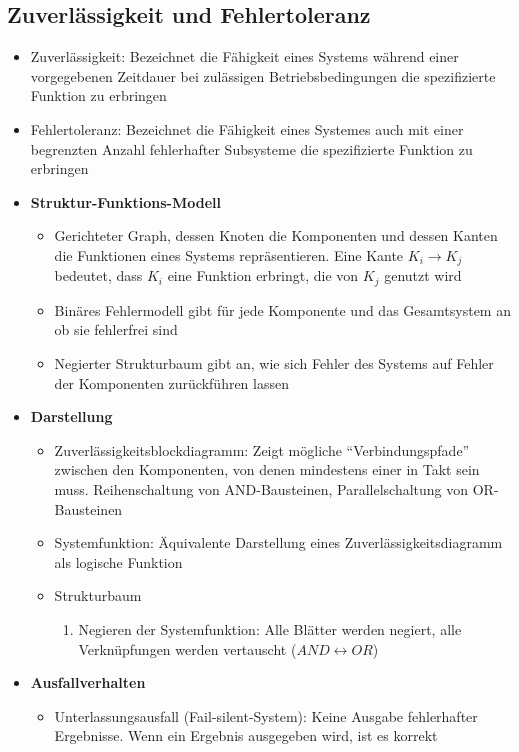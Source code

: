 \subsection{Zuverlässigkeit und Fehlertoleranz}
\begin{itemize}
	\item Zuverlässigkeit: Bezeichnet die Fähigkeit eines Systems während einer vorgegebenen Zeitdauer bei zulässigen Betriebsbedingungen die spezifizierte Funktion zu erbringen
	\item Fehlertoleranz: Bezeichnet die Fähigkeit eines Systemes auch mit einer begrenzten Anzahl fehlerhafter Subsysteme die spezifizierte Funktion zu erbringen
	\item \textbf{Struktur-Funktions-Modell}
	\begin{itemize}
		\item Gerichteter Graph, dessen Knoten die Komponenten und dessen Kanten die Funktionen eines Systems repräsentieren. Eine Kante \(K_i \longrightarrow K_j\) bedeutet, dass \(K_i\) eine Funktion erbringt, die von \(K_j\) genutzt wird
		\item Binäres Fehlermodell gibt für jede Komponente und das Gesamtsystem an ob sie fehlerfrei sind
		\item Negierter Strukturbaum gibt an, wie sich Fehler des Systems auf Fehler der Komponenten zurückführen lassen
	\end{itemize}
	\item \textbf{Darstellung}
	\begin{itemize}
		\item Zuverlässigkeitsblockdiagramm: Zeigt mögliche "`Verbindungspfade"' zwischen den Komponenten, von denen mindestens einer in Takt sein muss. Reihenschaltung von AND-Bausteinen, Parallelschaltung von OR-Bausteinen
		\item Systemfunktion: Äquivalente Darstellung eines Zuverlässigkeitsdiagramm als logische Funktion
		\item Strukturbaum
		\begin{enumerate}
			\item Negieren der Systemfunktion: Alle Blätter werden negiert, alle Verknüpfungen werden vertauscht (\(AND \leftrightarrow OR\))
		\end{enumerate}
	\end{itemize}
	\item \textbf{Ausfallverhalten}
	\begin{itemize}
		\item Unterlassungsausfall (Fail-silent-System): Keine Ausgabe fehlerhafter Ergebnisse. Wenn ein Ergebnis ausgegeben wird, ist es korrekt

\end{itemize}
\end{itemize}
